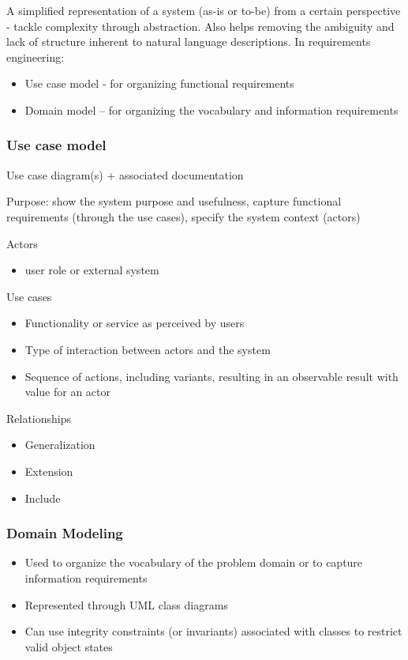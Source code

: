 \documentclass[../ESOF_notes.tex]{subfiles}
\begin{document}
A simplified representation of a system (as-is or to-be) from a certain perspective - tackle complexity through abstraction. 
Also helps removing the ambiguity and lack of structure inherent to natural language descriptions.
In requirements engineering:
\begin{itemize}
    \item Use case model - for organizing functional requirements
    \item Domain model – for organizing the vocabulary and information requirements
\end{itemize}


\subsubsection{Use case model}
Use case diagram(s) + associated documentation

Purpose: show the system purpose and usefulness, capture functional requirements (through the use cases), specify the system context (actors)

Actors
\begin{itemize}
    \item user role or external system
\end{itemize}

Use cases
\begin{itemize}
    \item Functionality or service as perceived by users
    \item Type of interaction between actors and the system
    \item Sequence of actions, including variants, resulting in an observable
    result with value for an actor
    
\end{itemize}

Relationships

\begin{itemize}
    \item Generalization
    \item Extension
    \item Include
\end{itemize}

\subsubsection{Domain Modeling}
\begin{itemize}
    \item Used to organize the vocabulary of the problem domain or to capture information requirements
    \item Represented through UML class diagrams
    \item Can use integrity constraints (or invariants) associated with classes to restrict valid object states
\end{itemize}
\end{document}
